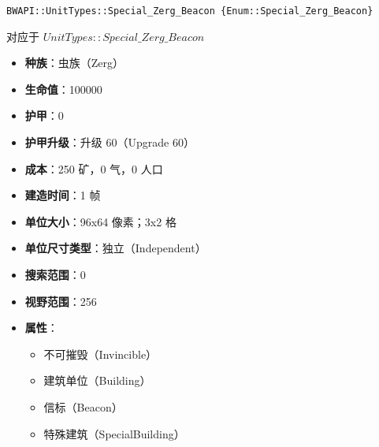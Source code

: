 \begin{tcolorbox}[colback=white, colframe=black!60!white, title=Special\_Zerg\_Beacon(), arc=0mm]
    \begin{verbatim}
BWAPI::UnitTypes::Special_Zerg_Beacon {Enum::Special_Zerg_Beacon}
    \end{verbatim}
    对应于  $UnitTypes::Special\_Zerg\_Beacon$ 
    \begin{itemize}
        \item \textbf{种族}：虫族（Zerg）
        \item \textbf{生命值}：100000
        \item \textbf{护甲}：0
        \item \textbf{护甲升级}：升级 60（Upgrade 60）
        \item \textbf{成本}：250 矿，0 气，0 人口
        \item \textbf{建造时间}：1 帧
        \item \textbf{单位大小}：96x64 像素；3x2 格
        \item \textbf{单位尺寸类型}：独立（Independent）
        \item \textbf{搜索范围}：0
        \item \textbf{视野范围}：256
        \item \textbf{属性}：
            \begin{itemize}
                \item 不可摧毁（Invincible）
                \item 建筑单位（Building）
                \item 信标（Beacon）
                \item 特殊建筑（SpecialBuilding）
            \end{itemize}
    \end{itemize}
\end{tcolorbox}

